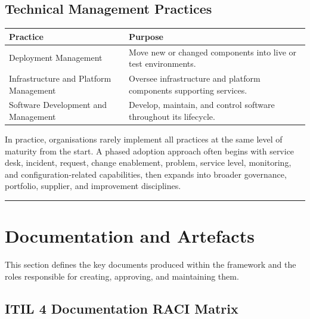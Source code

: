 \documentclass[
  letterpaper,
  DIV=11,
  numbers=noendperiod]{scrartcl}
\begin{document}
\subsection{Technical Management
Practices}\label{technical-management-practices}

\begin{longtable}[]{@{}
  >{\raggedright\arraybackslash}p{}
  >{\raggedright\arraybackslash}p{}@{}}
\toprule\noalign{}
\begin{minipage}[b]{\linewidth}\raggedright
Practice
\end{minipage} & \begin{minipage}[b]{\linewidth}\raggedright
Purpose
\end{minipage} \\
\midrule\noalign{}
\endhead
\bottomrule\noalign{}
\endlastfoot
Deployment Management & Move new or changed components into live or test
environments. \\
Infrastructure and Platform Management & Oversee infrastructure and
platform components supporting services. \\
Software Development and Management & Develop, maintain, and control
software throughout its lifecycle. \\
\end{longtable}

In practice, organisations rarely implement all practices at the same
level of maturity from the start. A phased adoption approach often
begins with service desk, incident, request, change enablement, problem,
service level, monitoring, and configuration-related capabilities, then
expands into broader governance, portfolio, supplier, and improvement
disciplines.

\begin{center}\rule{0.5\linewidth}{0.5pt}\end{center}

\section{Documentation and Artefacts}\label{documentation-and-artefacts}

This section defines the key documents produced within the framework and
the roles responsible for creating, approving, and maintaining them.

\subsection{ITIL 4 Documentation RACI
Matrix}\label{itil-4-documentation-raci-matrix}
\end{document}
